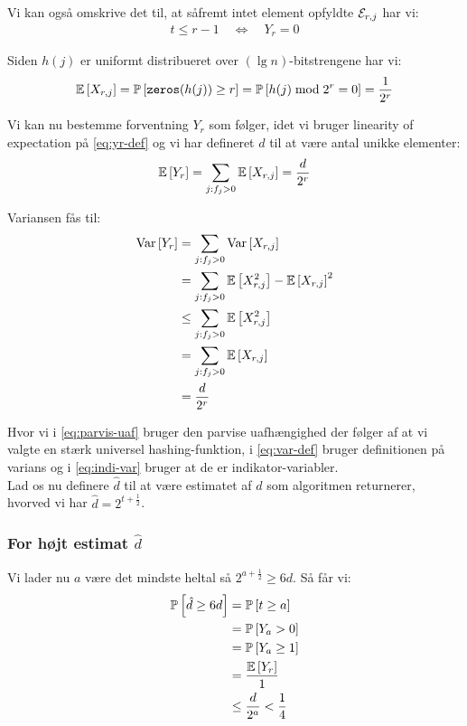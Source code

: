 Vi kan også omskrive det til, at såfremt intet element opfyldte ${\mathcal{E}}_{r,j}$ har vi:
\begin{align}
  t \leq r - 1 \quad \Longleftrightarrow \quad Y_r = 0 \label{eq:t-leq-r}
\end{align}

Siden $h(j)$ er uniformt distribueret over $(\lg n)$-bitstrengene har vi:
$$
\mathbb{E} \left[  X_{r,j}  \right] = \mathbb{P} \left[  \mathtt{zeros}(h(j)) \geq r  \right] = \mathbb{P} \left[  h(j) \bmod 2^r = 0  \right] = \frac{1}{2^r}
$$

Vi kan nu bestemme forventning $Y_r$ som følger, idet vi bruger linearity of expectation på \cref{eq:yr-def} og vi har defineret $d$ til at være antal unikke elementer:
\begin{align}
  \mathbb{E} \left[  Y_r  \right] = \sum_{j: f_j > 0} \mathbb{E} \left[  X_{r,j}  \right] = \frac{d}{2^r}
\end{align}


Variansen fås til:
\begin{align}
  \text{Var} \left[  Y_r  \right]
  &= \sum_{j: f_j > 0} \text{Var} \left[  X_{r,j}  \right] \label{eq:parvis-uaf} \\
  &= \sum_{j: f_j > 0} \mathbb{E} \left[  X_{r,j}^2  \right] - \mathbb{E} \left[  X_{r,j}  \right]^2 \label{eq:var-def} \\
  &\leq \sum_{j: f_j > 0} \mathbb{E} \left[  X_{r,j}^2  \right] \nonumber \\
  &= \sum_{j: f_j > 0} \mathbb{E} \left[  X_{r,j}  \right] \label{eq:indi-var} \\
  &= \frac{d}{2^r} \nonumber
\end{align}

Hvor vi i \cref{eq:parvis-uaf} bruger den parvise uafhængighed der følger af at vi valgte en stærk universel hashing-funktion, i \cref{eq:var-def} bruger definitionen på varians og i \cref{eq:indi-var} bruger at de er indikator-variabler.\\

Lad os nu definere $\hat d$ til at være estimatet af $d$ som algoritmen returnerer, hvorved vi har $\hat d = 2^{t + \frac{1}{2}}$.

\subsubsection{For højt estimat $\hat d$}
Vi lader nu $a$ være det mindste heltal så $2^{a + \frac{1}{2}} \geq 6d$. Så får vi:
\begin{align}
  \mathbb{P} \left[  \hat d \geq 6d  \right]
  &= \mathbb{P} \left[  t \geq a  \right] \label{eq:t-stoerre-a} \\
  &= \mathbb{P} \left[  Y_a > 0  \right] \label{eq:benyt-ulighed} \\
  &= \mathbb{P} \left[  Y_a \geq 1  \right] \nonumber \\
  &= \frac{\mathbb{E} \left[  Y_r  \right]}{1} \label{eq:benyt-markov} \\
  &\leq \frac{d}{2^a} < \frac{1}{4} \label{eq:benyt-forventet-yr}
\end{align}

